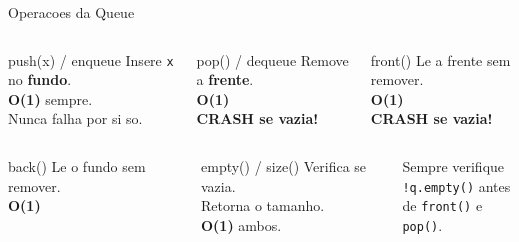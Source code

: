 \documentclass[aspectratio=169,11pt]{beamer}
\begin{document}
\begin{frame}{Operacoes da Queue}
  \begin{columns}[t]
      \begin{exampleblock}{push(x) / enqueue}
        \small
        Insere \texttt{x} no \textbf{fundo}.\\[4pt]
        \textbf{O(1)} sempre.\\[4pt]
        Nunca falha por si so.
      \end{exampleblock}
      \begin{alertblock}{pop() / dequeue}
        \small
        Remove a \textbf{frente}.\\[4pt]
        \textbf{O(1)}\\[4pt]
        \textcolor{gemaRed}{\textbf{CRASH se vazia!}}
      \end{alertblock}
      \begin{block}{front()}
        \small
        Le a frente sem remover.\\[4pt]
        \textbf{O(1)}\\[4pt]
        \textcolor{gemaRed}{\textbf{CRASH se vazia!}}
      \end{block}
  \end{columns}
  \vspace{0.2cm}
  \begin{columns}[t]
      \begin{block}{back()}
        \small
        Le o fundo sem remover.\\[4pt]
        \textbf{O(1)}
      \end{block}
      \begin{block}{empty() / size()}
        \small
        Verifica se vazia.\\
        Retorna o tamanho.\\[4pt]
        \textbf{O(1)} ambos.
      \end{block}
      \begin{tcolorbox}[caixaVerde,title={Dica de Prova}]
        \small
        Sempre verifique\\
        \texttt{!q.empty()} antes\\
        de \texttt{front()} e \texttt{pop()}.
      \end{tcolorbox}

\end{columns}
\end{frame}
\end{document}
